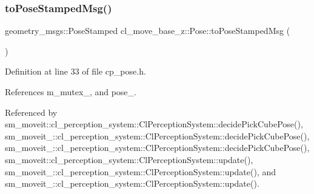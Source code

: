 \subsubsection{\texorpdfstring{to\+Pose\+Stamped\+Msg()}{toPoseStampedMsg()}}
{\footnotesize\ttfamily geometry\+\_\+msgs\+::\+Pose\+Stamped cl\+\_\+move\+\_\+base\+\_\+z\+::\+Pose\+::to\+Pose\+Stamped\+Msg (\begin{DoxyParamCaption}{ }\end{DoxyParamCaption})\hspace{0.3cm}{\ttfamily [inline]}}



Definition at line 33 of file cp\+\_\+pose.\+h.



References m\+\_\+mutex\+\_\+, and pose\+\_\+.



Referenced by sm\+\_\+moveit\+::cl\+\_\+perception\+\_\+system\+::\+Cl\+Perception\+System\+::decide\+Pick\+Cube\+Pose(), sm\+\_\+moveit\+\_\+::cl\+\_\+perception\+\_\+system\+::\+Cl\+Perception\+System\+::decide\+Pick\+Cube\+Pose(), sm\+\_\+moveit\+\_\+::cl\+\_\+perception\+\_\+system\+::\+Cl\+Perception\+System\+::decide\+Pick\+Cube\+Pose(), sm\+\_\+moveit\+::cl\+\_\+perception\+\_\+system\+::\+Cl\+Perception\+System\+::update(), sm\+\_\+moveit\+\_\+::cl\+\_\+perception\+\_\+system\+::\+Cl\+Perception\+System\+::update(), and sm\+\_\+moveit\+\_\+::cl\+\_\+perception\+\_\+system\+::\+Cl\+Perception\+System\+::update().


